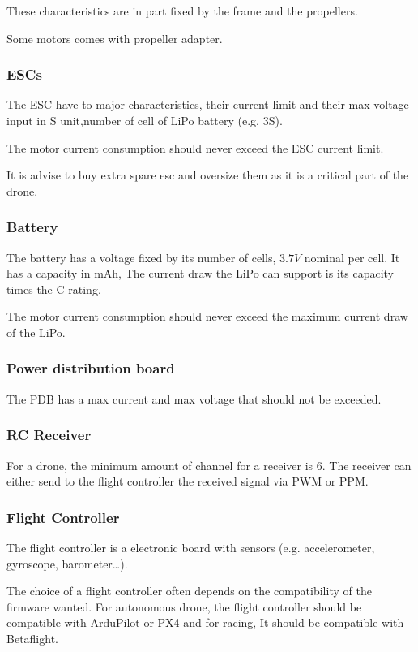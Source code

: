These characteristics are in part fixed by the frame and the propellers.

Some motors comes with propeller adapter.

\subsubsection{ESCs}
The ESC have to major characteristics, their current limit and their max voltage input in S unit,number of cell of LiPo battery (e.g. 3S).

The motor current consumption should never exceed the ESC current limit.

It is advise to buy extra spare esc and oversize them as it is a critical part of the drone.

\subsubsection{Battery}
The battery has a voltage fixed by its number of cells, $3.7V$ nominal per cell.
It has a capacity in mAh,
The current draw the LiPo can support is its capacity times the C-rating.

The motor current consumption should never exceed the maximum current draw of the LiPo.

\subsubsection{Power distribution board}
The PDB has a max current and max voltage that should not be exceeded.

\subsubsection{RC Receiver}
For a drone, the minimum amount of channel for a receiver is 6.
The receiver can either send to the flight controller the received signal via PWM or PPM.

\subsubsection{Flight Controller}
The flight controller is a electronic board with sensors (e.g. accelerometer, gyroscope, barometer…).

The choice of a flight controller often depends on the compatibility of the firmware wanted. For autonomous drone, the flight controller should be compatible with ArduPilot or PX4 and for racing, It should be compatible with Betaflight.

